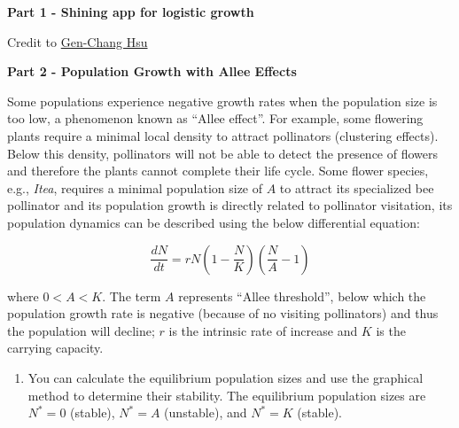 \documentclass[
]{book}
\providecommand{\tightlist}{%
  \setlength{\itemsep}{0pt}\setlength{\parskip}{0pt}}
\begin{document}
\textbf{Part 1 - Shining app for logistic growth}

Credit to \href{https://genchanghsu.github.io/index.html}{Gen-Chang Hsu}

\textbf{Part 2 - Population Growth with Allee Effects}

Some populations experience negative growth rates when the population size is too low, a phenomenon known as ``Allee effect''. For example, some flowering plants require a minimal local density to attract pollinators (clustering effects). Below this density, pollinators will not be able to detect the presence of flowers and therefore the plants cannot complete their life cycle. Some flower species, e.g., \emph{Itea}, requires a minimal population size of \(A\) to attract its specialized bee pollinator and its population growth is directly related to pollinator visitation, its population dynamics can be described using the below differential equation:

\[
\frac{dN}{dt} = rN(1-\frac{N}{K})(\frac{N}{A}-1)
\]

where \(0 < A < K\). The term \(A\) represents ``Allee threshold'', below which the population growth rate is negative (because of no visiting pollinators) and thus the population will decline; \(r\) is the intrinsic rate of increase and \(K\) is the carrying capacity.

\begin{enumerate}
\def\labelenumi{(\arabic{enumi})}
\tightlist
\item
  You can calculate the equilibrium population sizes and use the graphical method to determine their stability. The equilibrium population sizes are \(N^* = 0\) (stable), \(N^* = A\) (unstable), and \(N^* = K\) (stable).
\end{enumerate}
\end{document}
